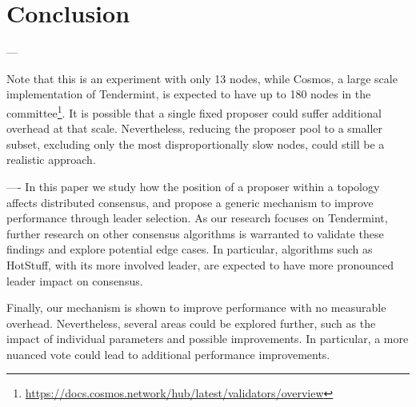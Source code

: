 


\section{Conclusion}

---

Note that this is an experiment with only 13 nodes, while Cosmos, a large scale implementation of Tendermint, is expected to have up to 180 nodes in the committee\footnote{\url{https://docs.cosmos.network/hub/latest/validators/overview}}. It is possible that a single fixed proposer could suffer additional overhead at that scale. Nevertheless, reducing the proposer pool to a smaller subset, excluding only the most disproportionally slow nodes, could still be a realistic approach. 


----
In this paper we study how the position of a proposer within a topology affects distributed consensus, and propose a generic mechanism to improve performance through leader selection. As our research focuses on Tendermint, further research on other consensus algorithms is warranted to validate these findings and explore potential edge cases. In particular, algorithms such as HotStuff, with its more involved leader, are expected to have more pronounced leader impact on consensus. 

Finally, our mechanism is shown to improve performance with no measurable overhead. Nevertheless, several areas could be explored further, such as the impact of individual parameters and possible improvements. In particular, a more nuanced vote could lead to  additional performance improvements. 
